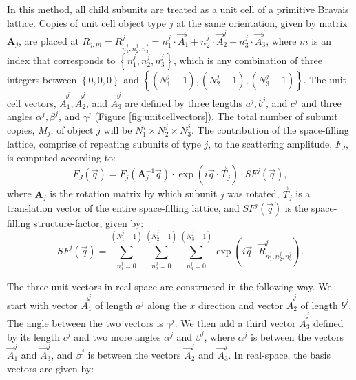 \documentclass[../D+Manual.tex]{subfiles}
\begin{document}
In this method, all child subunits are treated as a unit cell of a primitive Bravais lattice. Copies of unit cell object type $j$ at the same orientation, given by  matrix $\mathbf{A}_{j}$, are placed at $R_{j,m}=R^j_{n^j_1,n^j_2,n^j_3}=n^j_1\cdot\vec{A}^j_1+n^j_2\cdot\vec{A}^j_2+n^j_3\cdot\vec{A}^j_3$, where $m$ is an index that  corresponds to $\left\lbrace n^j_1,n^j_2,n^j_3\right\rbrace$, which is any combination of three integers between $\left\lbrace 0,0,0\right\rbrace$ and  $\left\lbrace\left( N_1^{j}-1\right),\left(N_2^{j}-1\right),\left(N_3^{j}-1\right)\right\rbrace$.
The unit cell vectors, $\vec{A}^j_1,\vec{A}^j_2$, and $\vec{A}^j_3$ are defined by three lengths $a^j,b^j$, and $c^j$ and three angles $\alpha^j,\beta^j$, and $\gamma^j$ (Figure \ref{fig:unitcellvectors}).
The total number of subunit copies, $M_j$, of object $j$ will be $N_1^{j}\times N_2^{j}\times N_3^{j}$. The contribution of the space-filling lattice, comprise of repeating subunits of type $j$, to the scattering amplitude, $F_J$, is computed according to:
\begin{equation}
\label{eqn:assemblyScatteringAmplitudeSFS}
F_J\left(\vec{q}\right)=
F_{j}\left(\mathbf{A}_{j}^{-1}\vec{q}\right)\cdot\exp\left(i\vec{q}\cdot\vec{T}_{j}\right)\cdot SF^j(\vec{q}),
\end{equation}
where $\mathbf{A}_{j}$ is the rotation matrix by which subunit $j$ was rotated, $\vec{T}_j$ is a translation vector of the  entire space-filling lattice, and $SF^j(\vec{q})$ is the space-filling structure-factor, given by:
\begin{equation}
\label{eqn:assemblyScatteringSFS}
SF^j(\vec{q})=
\overset{\left(N_{1}^{j}-1\right)}{\underset{n^{j}_{1}=0}{\sum}}\overset{\left(N_{2}^{j}-1\right)}{\underset{n^{j}_{2}=0}{\sum}}\overset{\left(N_{3}^{j}-1\right)}{\underset{n^{j}_{3}=0}{\sum}}\exp\left(i\vec{q}\cdot\vec{R}^j_{n^{j}_{1},n^{j}_{2},n^{j}_{3}}\right).
\end{equation} 

The three unit vectors in real-space are constructed in the following way. We start with vector $\vec{A}^{j}_{1}$ of
length $a^j$ along the $x$ direction and vector $\vec{A}^{j}_{2}$ of length
$b^j$. The angle between the two vectors is $\gamma^j$. We then
add a third vector $\vec{A}^{j}_{3}$ defined by its length $c^j$
and two more angles $\alpha^j$ and $\beta^j$, where $\alpha^j$ is between
the vectors $\vec{A}^{j}_{1}$ and $\vec{A}^{j}_{3}$, and $\beta^j$ is between
the vectors $\vec{A}^{j}_{2}$ and $\vec{A}^{j}_{3}$. In real-space, the basis
vectors are given by:
\end{document}
